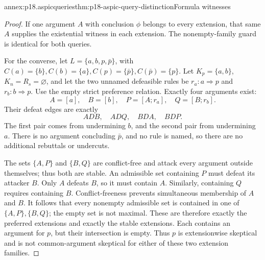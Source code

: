 \begin{annexitem}{annex:p18.aspicqueries}{thm:p18-aspic-query-distinction}{Formula witnesses}
\begin{proof}
If one argument \(A\) with conclusion \(\phi\) belongs to every extension,
that same \(A\) supplies the existential witness in each extension.
The nonempty-family guard is identical for both queries.

For the converse, let \(L=\{a,b,p,\bar p\}\), with
\(C(a)=\{b\}, C(b)=\{a\}, C(p)=\{\bar p\}, C(\bar p)=\{p\}\).
Let \(K_p=\{a,b\}\), \(K_n=R_s=\varnothing\), and let the two
unnamed defeasible rules be \(r_a:a\Rightarrow p\) and
\(r_b:b\Rightarrow p\). Use the empty strict preference relation.
Exactly four arguments exist:
\[
 A=[a],\quad B=[b],\quad P=[A;r_a],\quad Q=[B;r_b].
\]
Their defeat edges are exactly
\[
 A D B,\quad A D Q,\quad B D A,\quad B D P.
\]
The first pair comes from undermining \(b\), and the second pair from
undermining \(a\). There is no argument concluding \(\bar p\), and no
rule is named, so there are no additional rebuttals or undercuts.

The sets \(\{A,P\}\) and \(\{B,Q\}\) are conflict-free and attack
every argument outside themselves; thus both are stable.
An admissible set containing \(P\) must defeat its attacker \(B\).
Only \(A\) defeats \(B\), so it must contain \(A\).
Similarly, containing \(Q\) requires containing \(B\).
Conflict-freeness prevents simultaneous membership of \(A\) and \(B\).
It follows that every nonempty admissible set is contained in one of
\(\{A,P\},\{B,Q\}\); the empty set is not maximal. These are therefore
exactly the preferred extensions and exactly the stable extensions.
Each contains an argument for \(p\), but their intersection is empty.
Thus \(p\) is extensionwise skeptical and is not common-argument skeptical
for either of these two extension families.
\end{proof}
\end{annexitem}


